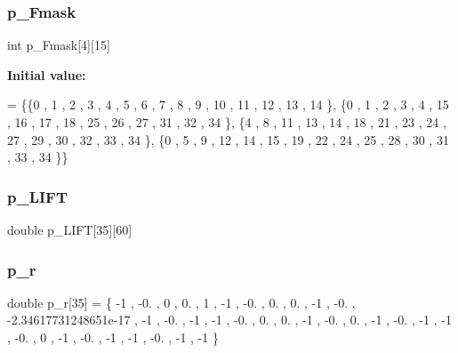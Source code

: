 \mbox{\label{a00488_af587c3d8c1a998443c38db4f4d737779}} 
\subsubsection{\texorpdfstring{p\+\_\+\+Fmask}{p\_Fmask}}
{\footnotesize\ttfamily int p\+\_\+\+Fmask\mbox{[}4\mbox{]}\mbox{[}15\mbox{]}}

{\bfseries Initial value\+:}
\begin{DoxyCode}
= \{\{0 , 1 , 2 , 3 , 4 , 5 , 6 , 7 , 8 , 9 , 10 , 11 , 12 , 13 , 14 \},
\{0 , 1 , 2 , 3 , 4 , 15 , 16 , 17 , 18 , 25 , 26 , 27 , 31 , 32 , 34 \},
\{4 , 8 , 11 , 13 , 14 , 18 , 21 , 23 , 24 , 27 , 29 , 30 , 32 , 33 , 34 \},
\{0 , 5 , 9 , 12 , 14 , 15 , 19 , 22 , 24 , 25 , 28 , 30 , 31 , 33 , 34 \}\}
\end{DoxyCode}
\mbox{\label{a00488_abdf8cec6ca36448f72220090d9c64fc7}} 
\subsubsection{\texorpdfstring{p\+\_\+\+L\+I\+FT}{p\_LIFT}}
{\footnotesize\ttfamily double p\+\_\+\+L\+I\+FT\mbox{[}35\mbox{]}\mbox{[}60\mbox{]}}

\mbox{\label{a00488_a325a84e3e6f6058f997996098055b862}} 
\subsubsection{\texorpdfstring{p\+\_\+r}{p\_r}}
{\footnotesize\ttfamily double p\+\_\+r\mbox{[}35\mbox{]} = \{ -\/1 , -\/0. , 0 , 0. , 1 , -\/1 , -\/0. , 0. , 0. , -\/1 , -\/0. , -\/2.\+34617731248651e-\/17 , -\/1 , -\/0. , -\/1 , -\/1 , -\/0. , 0. , 0. , -\/1 , -\/0. , 0. , -\/1 , -\/0. , -\/1 , -\/1 , -\/0. , 0 , -\/1 , -\/0. , -\/1 , -\/1 , -\/0. , -\/1 , -\/1 \}}

